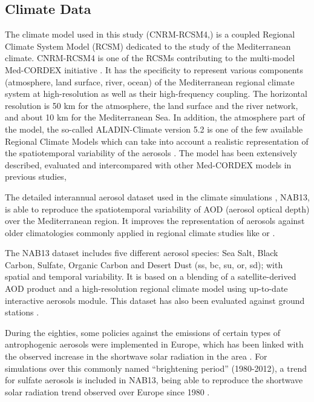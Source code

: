 \subsection{Climate Data}

The climate model used in this study (CNRM-RCSM4,\cite*{Sevault2014}) is a coupled Regional Climate System Model (RCSM) dedicated to the study of the Mediterranean climate. CNRM-RCSM4 is one of the RCSMs contributing to the multi-model Med-CORDEX initiative \cite*{Ruti2016}. It has the specificity to represent various components (atmosphere, land surface, river, ocean) of the Mediterranean regional climate system at high-resolution as well as their high-frequency coupling. The horizontal resolution is 50 km for the atmosphere, the land surface and the river network, and about 10 km for the Mediterranean Sea. In addition, the atmosphere part of the model, the so-called ALADIN-Climate version 5.2 \cite*{Colin2010} is one of the few available Regional Climate Models which can take into account a realistic representation of the spatiotemporal variability of the aerosols \cite*{Nabat2014}. The model has been extensively described, evaluated and intercompared with other Med-CORDEX models in previous studies, \cite{Sevault2014, Nabat2014, Nabat2014a,Flaounas2016, Gaertner2016, DellAquila2016, Harzallah2016, Cavicchia2016}

The detailed interannual aerosol dataset used in the climate simulations \cite*{Nabat2013}, NAB13, is able to reproduce the spatiotemporal variability of AOD (aerosol optical depth) over the Mediterranean region. It improves the representation of aerosols against older climatologies commonly applied in regional climate studies like \cite{Tegen1997} or \cite{tanre1984}.

The NAB13 dataset includes five different aerosol species: Sea Salt, Black Carbon, Sulfate, Organic Carbon and Desert Dust (ss, bc, su, or, sd); with spatial and temporal variability. It is based on a blending of a satellite-derived AOD product and a high-resolution regional climate model using up-to-date interactive aerosols module. This dataset has also been evaluated against ground stations \cite*{Nabat2013}.

During the eighties, some policies against the emissions of certain types of antrophogenic aerosols were implemented in Europe, which has been linked with the observed increase in the shortwave solar radiation in the area \cite*{Wild2005}. For simulations over this commonly named ``brightening period'' (1980-2012), a trend for sulfate aerosols is included in NAB13, being able to reproduce the shortwave solar radiation trend observed over Europe since 1980 \cite*{Nabat2014a}.


